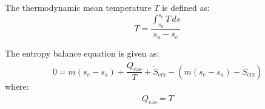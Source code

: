 The thermodynamic mean temperature \( T \) is defined as:  
\[
T = \frac{\int_{s_a}^{s_e} T \, ds}{s_a - s_e}
\]  

The entropy balance equation is given as:  
\[
0 = \dot{m}(s_e - s_a) + \frac{\dot{Q}_{\text{cas}}}{T} + \dot{S}_{\text{crz}} - \left( \dot{m}(s_e - s_a) - \dot{S}_{\text{crz}} \right)
\]  
where:  
\[
\dot{Q}_{\text{cas}} = T
\]